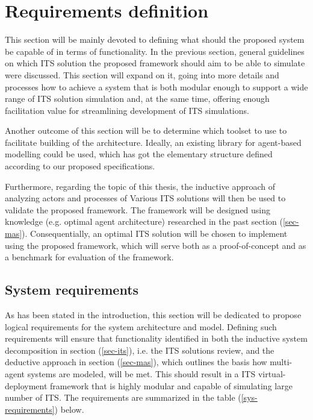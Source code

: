 \documentclass[main.tex]{subfiles}
\begin{document}
\section{Requirements definition}\label{sec-requirements}

This section will be mainly devoted to defining what should the proposed system be capable of in terms 
of functionality. In the previous section, general guidelines on which ITS solution the proposed 
framework should aim to be able to simulate were discussed. This section will expand on it, 
going into more details and processes how to achieve a system that is both modular enough to support 
a wide range of ITS solution simulation and, at the same time, offering enough facilitation value 
for streamlining development of ITS simulations. 

Another outcome of this section will be to determine which toolset to use to facilitate building of 
the architecture. Ideally, an existing library for agent-based modelling could be used, which has got 
the elementary structure defined according to our proposed specifications.

Furthermore, regarding the topic of this thesis, the inductive approach of analyzing actors and
processes of Various ITS solutions will then be used to validate the proposed framework. The
framework will be designed using knowledge (e.g. optimal agent architecture) researched in the
past section (\ref{sec-mas}).  Consequentially, an optimal ITS solution will be chosen to implement
using the proposed framework, which will serve both as a proof-of-concept and as a benchmark
for evaluation of the framework.  

\subsection{System requirements}

As has been stated in the introduction, this section will be dedicated to propose logical
requirements for the system architecture and model. Defining such requirements will ensure that
functionality identified in both the inductive system decomposition in section (\ref{sec-its}),
i.e. the ITS solutions review, and the deductive approach in section (\ref{sec-mas}), which 
outlines the basis how multi-agent systems are modeled, will be met. This should result 
in a ITS virtual-deployment framework that is highly modular and capable of simulating large 
number of ITS. The requirements are summarized in the table (\ref{sys-requirements}) below.
\end{document}
